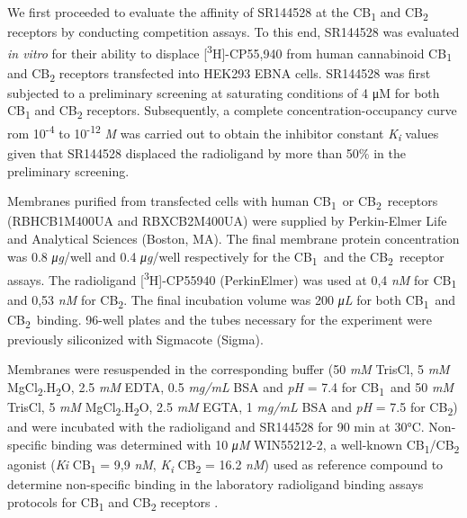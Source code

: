 \documentclass[empirical, authordate]{jote-new-article}
\begin{document}
We first proceeded to evaluate the affinity of SR144528 at the CB\textsubscript{1} and CB\textsubscript{2} receptors by conducting competition assays. To this end, SR144528 was evaluated \emph{in vitro} for their ability to displace [\textsuperscript{3}H]-CP55,940 from human cannabinoid CB\textsubscript{1 }and CB\textsubscript{2} receptors transfected into HEK293 EBNA cells. SR144528 was first subjected to a preliminary screening at saturating conditions of 4 μM for both CB\textsubscript{1} and CB\textsubscript{2} receptors. Subsequently, a complete concentration-occupancy curve rom 10\textsuperscript{-4} to 10\textsuperscript{-12 }\emph{M} was carried out to obtain the inhibitor constant \emph{K}\textsubscript{\emph{i}} values given that SR144528 displaced the radioligand by more than 50\% in the preliminary screening.

Membranes purified from transfected cells with human CB\textsubscript{1} or CB\textsubscript{2} receptors (RBHCB1M400UA and RBXCB2M400UA) were supplied by Perkin-Elmer Life and Analytical Sciences (Boston, MA). The final membrane protein concentration was 0.8 \emph{μg}/well and 0.4 \emph{μg}/well respectively for the CB\textsubscript{1} and the CB\textsubscript{2} receptor assays. The radioligand [\textsuperscript{3}H]-CP55940 (PerkinElmer) was used at 0,4 \emph{nM} for CB\textsubscript{1} and 0,53 \emph{nM }for CB\textsubscript{2}. The final incubation volume was 200 \emph{μ}\emph{L} for both CB\textsubscript{1} and CB\textsubscript{2} binding. 96-well plates and the tubes necessary for the experiment were previously siliconized with Sigmacote (Sigma).

Membranes were resuspended in the corresponding buffer (50 \emph{mM} TrisCl, 5 \emph{mM} MgCl\textsubscript{2}.H\textsubscript{2}O, 2.5 \emph{mM} EDTA, 0.5 \emph{mg/mL} BSA and \emph{pH} = 7.4 for CB\textsubscript{1} and 50 \emph{mM} TrisCl, 5 \emph{mM} MgCl\textsubscript{2}.H\textsubscript{2}O, 2.5 \emph{mM} EGTA, 1 \emph{mg/mL }BSA and \emph{pH} = 7.5 for CB\textsubscript{2}) and were incubated with the radioligand and SR144528 for 90 min at 30°C. Non-specific binding was determined with 10 \emph{μ}\emph{M} WIN55212-2, a well-known CB\textsubscript{1}/CB\textsubscript{2} agonist (\emph{Ki} CB\textsubscript{1} = 9,9 \emph{nM}, \emph{K\textsubscript{i}} CB\textsubscript{2} = 16.2 \emph{nM}) \parencite{Rinaldi-Carmona1994} used as reference compound to determine non-specific binding in the laboratory radioligand binding assays protocols for CB\textsubscript{1} and CB\textsubscript{2} receptors \parencite{Cumella2012, Deiana2016}.
\end{document}
